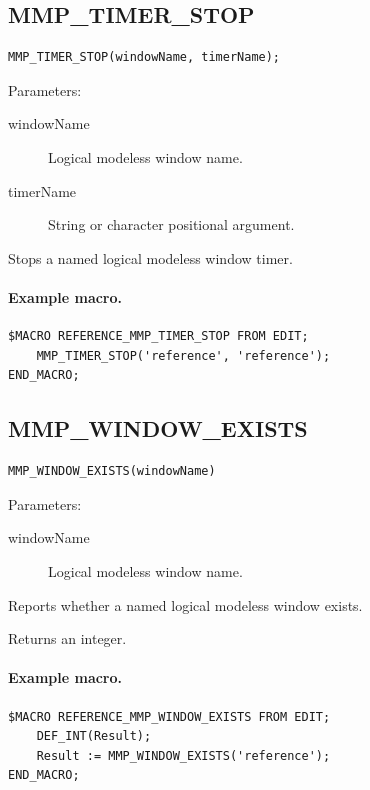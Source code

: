 \documentclass[a4paper,10pt,twoside,openany]{book}
\newenvironment{mrmacextension}{\begin{changebar}}{\end{changebar}}
\begin{document}
\begin{mrmacextension}
\label{prim:procedure-mmp-timer-stop}
\subsection*{MMP\_TIMER\_STOP}
\begin{verbatim}
MMP_TIMER_STOP(windowName, timerName);
\end{verbatim}
Parameters:
\begin{description}
\item[windowName] Logical modeless window name.
\item[timerName] String or character positional argument.
\end{description}

Stops a named logical modeless window timer.

\paragraph{Example macro.}
\begin{verbatim}
$MACRO REFERENCE_MMP_TIMER_STOP FROM EDIT;
    MMP_TIMER_STOP('reference', 'reference');
END_MACRO;
\end{verbatim}
\end{mrmacextension}

\begin{mrmacextension}
\label{prim:intrinsic-mmp-window-exists}
\subsection*{MMP\_WINDOW\_EXISTS}
\begin{verbatim}
MMP_WINDOW_EXISTS(windowName)
\end{verbatim}
Parameters:
\begin{description}
\item[windowName] Logical modeless window name.
\end{description}

Reports whether a named logical modeless window exists.

Returns an integer.

\paragraph{Example macro.}
\begin{verbatim}
$MACRO REFERENCE_MMP_WINDOW_EXISTS FROM EDIT;
    DEF_INT(Result);
    Result := MMP_WINDOW_EXISTS('reference');
END_MACRO;
\end{verbatim}
\end{mrmacextension}
\end{document}
